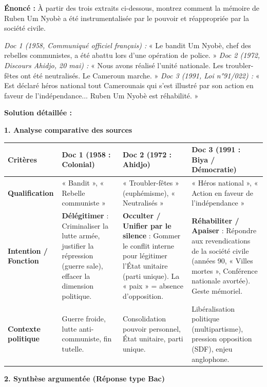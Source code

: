 \documentclass[11pt]{article}
\begin{document}
\begin{exoresolu}
\textbf{Énoncé :} À partir des trois extraits ci-dessous, montrez comment la mémoire de Ruben Um Nyobè a été instrumentalisée par le pouvoir et réappropriée par la société civile.

\textit{Doc 1 (1958, Communiqué officiel français) :} « Le bandit Um Nyobè, chef des rebelles communistes, a été abattu lors d'une opération de police. »
\textit{Doc 2 (1972, Discours Ahidjo, 20 mai) :} « Nous avons réalisé l'unité nationale. Les troubler-fêtes ont été neutralisés. Le Cameroun marche. »
\textit{Doc 3 (1991, Loi n°91/022) :} « Est déclaré héros national tout Camerounais qui s'est illustré par son action en faveur de l'indépendance... Ruben Um Nyobè est réhabilité. »

\tcblower
\textbf{Solution détaillée :}

\textbf{1. Analyse comparative des sources}

\begin{center}
\begin{tabularx}{\linewidth}{|l|X|X|X|}\hline
\textbf{Critères} & \textbf{Doc 1 (1958 : Colonial)} & \textbf{Doc 2 (1972 : Ahidjo)} & \textbf{Doc 3 (1991 : Biya / Démocratie)} \\ \hline
\textbf{Qualification} & « Bandit », « Rebelle communiste » & « Troubler-fêtes » (euphémisme), « Neutralisés » & « Héros national », « Action en faveur de l'indépendance » \\ \hline
\textbf{Intention / Fonction} & \textbf{Délégitimer} : Criminaliser la lutte armée, justifier la répression (guerre sale), effacer la dimension politique. & \textbf{Occulter / Unifier par le silence} : Gommer le conflit interne pour légitimer l'État unitaire (parti unique). La « paix » = absence d'opposition. & \textbf{Réhabiliter / Apaiser} : Répondre aux revendications de la société civile (années 90, « Villes mortes », Conférence nationale avortée). Geste mémoriel. \\ \hline
\textbf{Contexte politique} & Guerre froide, lutte anti-communiste, fin tutelle. & Consolidation pouvoir personnel, État unitaire, parti unique. & Libéralisation politique (multipartisme), pression opposition (SDF), enjeu anglophone. \\ \hline
\end{tabularx}
\end{center}

\textbf{2. Synthèse argumentée (Réponse type Bac)}


\end{exoresolu}
\end{document}

